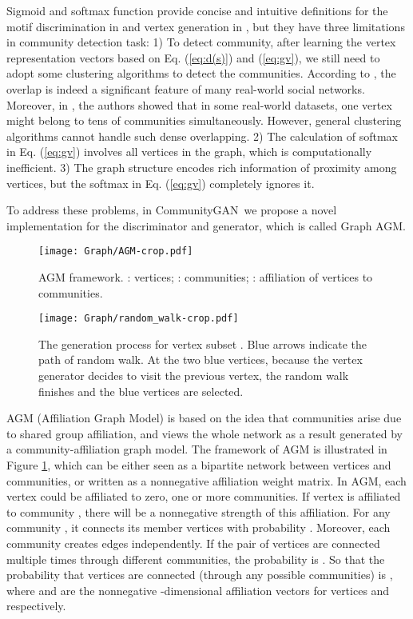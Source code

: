 \documentclass[sigconf]{acmart}
\newcommand{\ComGAN}{CommunityGAN}
\begin{document}
Sigmoid and softmax function provide concise and intuitive definitions for the motif discrimination in  and vertex generation in , but they have three limitations in community detection task:
1) To detect community, after learning the vertex representation vectors based on Eq. (\ref{eq:d(s)}) and (\ref{eq:gv}), we still need to adopt some clustering algorithms to detect the communities.
According to \cite{DBLP:journals/corr/abs-1110-5813}, the overlap is indeed a significant feature of many real-world social networks.
Moreover, in \cite{yang2012community}, the authors showed that in some real-world datasets, one vertex might belong to tens of communities simultaneously.
However, general clustering algorithms cannot handle such dense overlapping.
2) The calculation of softmax in Eq. (\ref{eq:gv}) involves all vertices in the graph, which is computationally inefficient.
3) The graph structure encodes rich information of proximity among vertices, but the softmax in Eq. (\ref{eq:gv}) completely ignores it.

To address these problems, in \ComGAN~we propose a novel implementation for the discriminator and generator, which is called Graph AGM.


\begin{figure}[]
\texttt{[image: Graph/AGM-crop.pdf]}
\caption{AGM framework. : vertices; : communities; : affiliation of vertices to communities.}
\label{fig:AGM}
\end{figure}


\begin{figure*}[t]
\texttt{[image: Graph/random\_walk-crop.pdf]}
\caption{The generation process for vertex subset . Blue arrows indicate the path of random walk. At the two blue vertices, because the vertex generator decides to visit the previous vertex, the random walk finishes and the blue vertices are selected.}
\label{fig:random_walk}
\end{figure*}

AGM (Affiliation Graph Model) \cite{yang2012community,yang2013overlapping} is based on the idea that communities arise due to shared group affiliation, and views the whole network as a result generated by a community-affiliation graph model.
The framework of AGM is illustrated in Figure \ref{fig:AGM}, which can be either seen as a bipartite network between vertices and communities, or written as a nonnegative affiliation weight matrix.
In AGM, each vertex could be affiliated to zero, one or more communities.
If vertex  is affiliated to community , there will be a nonnegative strength  of this affiliation.
For any community , it connects its member vertices  with probability .
Moreover, each community  creates edges independently.
If the pair of vertices  are connected multiple times through different communities, the probability is .
So that the probability that vertices  are connected (through any possible communities) is , where  and  are the nonnegative -dimensional affiliation vectors for vertices  and  respectively.
\end{document}
